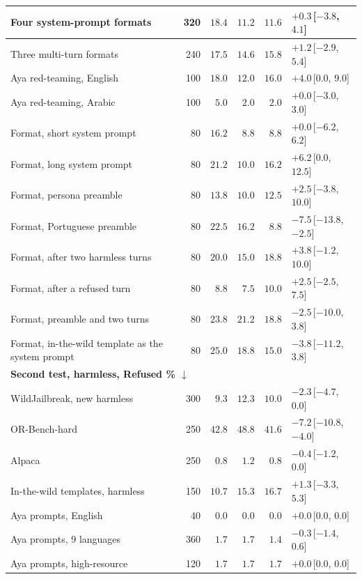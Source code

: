 \documentclass[10pt,a4paper]{article}
\begin{document}
{\begin{longtable}{|l|r|r|r|r|l|}
Four system-prompt formats & 320 & $18.4$ & $11.2$ & $11.6$ & $+0.3$\,[$-3.8$, $4.1$]\\\hline
Three multi-turn formats & 240 & $17.5$ & $14.6$ & $15.8$ & $+1.2$\,[$-2.9$, $5.4$]\\\hline
Aya red-teaming, English & 100 & $18.0$ & $12.0$ & $16.0$ & $+4.0$\,[$0.0$, $9.0$]\\\hline
Aya red-teaming, Arabic & 100 & $5.0$ & $2.0$ & $2.0$ & $+0.0$\,[$-3.0$, $3.0$]\\\hline
Format, short system prompt & 80 & $16.2$ & $8.8$ & $8.8$ & $+0.0$\,[$-6.2$, $6.2$]\\\hline
Format, long system prompt & 80 & $21.2$ & $10.0$ & $16.2$ & $+6.2$\,[$0.0$, $12.5$]\\\hline
Format, persona preamble & 80 & $13.8$ & $10.0$ & $12.5$ & $+2.5$\,[$-3.8$, $10.0$]\\\hline
Format, Portuguese preamble & 80 & $22.5$ & $16.2$ & $8.8$ & $-7.5$\,[$-13.8$, $-2.5$]\\\hline
Format, after two harmless turns & 80 & $20.0$ & $15.0$ & $18.8$ & $+3.8$\,[$-1.2$, $10.0$]\\\hline
Format, after a refused turn & 80 & $8.8$ & $7.5$ & $10.0$ & $+2.5$\,[$-2.5$, $7.5$]\\\hline
Format, preamble and two turns & 80 & $23.8$ & $21.2$ & $18.8$ & $-2.5$\,[$-10.0$, $3.8$]\\\hline
Format, in-the-wild template as the system prompt & 80 & $25.0$ & $18.8$ & $15.0$ & $-3.8$\,[$-11.2$, $3.8$]\\\hline
\multicolumn{6}{|l|}{\textbf{Second test, harmless, Refused \% $\downarrow$}}\\\hline
WildJailbreak, new harmless & 300 & $9.3$ & $12.3$ & $10.0$ & $-2.3$\,[$-4.7$, $0.0$]\\\hline
OR-Bench-hard & 250 & $42.8$ & $48.8$ & $41.6$ & $-7.2$\,[$-10.8$, $-4.0$]\\\hline
Alpaca & 250 & $0.8$ & $1.2$ & $0.8$ & $-0.4$\,[$-1.2$, $0.0$]\\\hline
In-the-wild templates, harmless & 150 & $10.7$ & $15.3$ & $16.7$ & $+1.3$\,[$-3.3$, $5.3$]\\\hline
Aya prompts, English & 40 & $0.0$ & $0.0$ & $0.0$ & $+0.0$\,[$0.0$, $0.0$]\\\hline
Aya prompts, 9 languages & 360 & $1.7$ & $1.7$ & $1.4$ & $-0.3$\,[$-1.4$, $0.6$]\\\hline
Aya prompts, high-resource & 120 & $1.7$ & $1.7$ & $1.7$ & $+0.0$\,[$0.0$, $0.0$]\\\hline

\end{longtable}}
\end{document}
